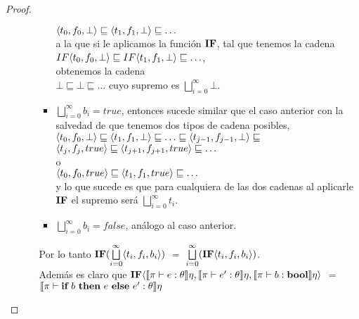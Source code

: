 \begin{proof}
\begin{itemize}
\begin{itemize}
\begin{itemize}
$\langle t_0,f_0,\bot \rangle \sqsubseteq \langle t_1,f_1,\bot \rangle \sqsubseteq \ldots$ \\

a la que si le aplicamos la funci\'on $\textbf{IF}$, tal que tenemos la cadena \\

$IF \langle t_0,f_0,\bot \rangle \sqsubseteq IF \langle t_1,f_1,\bot \rangle \sqsubseteq \ldots$, \\

obtenemos la cadena\\

$\bot \sqsubseteq \bot \sqsubseteq \ldots$ cuyo supremo es $\bigsqcup\limits^{\infty}_{i=0} \bot$.\\

\item $\bigsqcup\limits^{\infty}_{i=0}b_i = true$, entonces sucede similar que el caso anterior
con la salvedad de que tenemos dos tipos de cadena posibles,\\

$\langle t_0,f_0,\bot \rangle \sqsubseteq \langle t_1,f_1,\bot \rangle 
		\sqsubseteq \ldots \sqsubseteq \langle t_{j-1},f_{j-1},\bot \rangle \sqsubseteq $\\
$\langle t_j,f_j,true \rangle \sqsubseteq \langle t_{j+1},f_{j+1},true \rangle \sqsubseteq \ldots $\\

o \\

$\langle t_0,f_0,true \rangle \sqsubseteq \langle t_1,f_1,true \rangle \sqsubseteq \ldots$ \\

y lo que sucede es que para cualquiera de las dos cadenas al aplicarle $\textbf{IF}$ el supremo ser\'a 
$\bigsqcup\limits^{\infty}_{i=0} t_i$.

\item $\bigsqcup\limits^{\infty}_{i=0}b_i = false$, an\'alogo al caso anterior.

\end{itemize}

Por lo tanto $\textbf{IF} (\bigsqcup\limits^{\infty}_{i=0}\langle t_i,f_i,b_i \rangle)$ $=$
$\bigsqcup\limits^{\infty}_{i=0} (\textbf{IF} \langle t_i,f_i,b_i \rangle)$.\\

Adem\'as es claro que $\textbf{IF} \langle  \llbracket \pi \vdash e : \theta \rrbracket\eta
					  			  , \llbracket \pi \vdash e' : \theta \rrbracket\eta
								  , \llbracket \pi \vdash b : \textbf{bool} \rrbracket\eta
								   \rangle$ $=$
$\llbracket \pi \vdash \textbf{if} \ b \ \textbf{then} \ e \ \textbf{else} \ e' : \theta \rrbracket\eta$


\end{itemize}
\end{itemize}
\end{proof}
